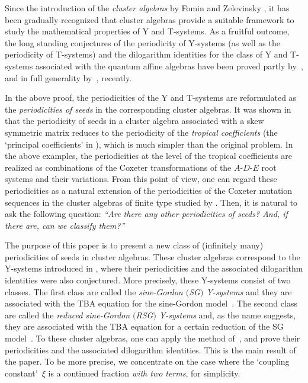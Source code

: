 \documentclass[pdftex]{sigma}
\numberwithin{equation}{section}
\theoremstyle{definition}
\begin{document}
Since the introduction of
the {\em cluster algebras}
by Fomin and Zelevinsky \cite{Fomin02, Fomin03a},
it has been gradually recognized that
cluster algebras provide a suitable
framework to study the mathema\-ti\-cal properties
of Y and T-systems.
As a fruitful outcome, the long standing conjectures
of the periodicity of Y-systems \cite{Zamolodchikov91,
Ravanini93,Kuniba94a}
 (as well as
the periodicity of  T-systems)
and the dilogarithm identities \cite{Kirillov90,Bazhanov90,
Kuniba93a,Gliozzi95}
 for the class of Y and T-systems
associated with the quantum af\/f\/ine algebras
have been
proved
partly
by~\cite{Fomin03b, Chapoton05},
and in full generality
by~\cite{Keller08,Inoue10c,
Nakanishi09,Keller10,Inoue10a,Inoue10b},
recently.


In the above proof, the periodicities of the
Y and T-systems  are reformulated as
the {\em periodici\-ties of seeds\/} in the corresponding cluster algebras.
It was shown in  \cite{Inoue10a} that
 the periodicity of seeds in
a cluster algebra associated with a skew symmetric matrix
reduces
to the periodicity of the
 {\em tropical coefficients} (the `principal coef\/f\/icients'
in \cite{Fomin07}),
which is much simpler than the original problem.
In the above examples,
the periodicities at the level of the tropical coef\/f\/icients
are realized
as combinations of the Coxeter transformations
of the $A$-$D$-$E$ root systems and their variations.
{}From this point of view,
one can regard  these periodicities as a natural extension
of the  periodicities of
the Coxeter mutation sequences
in the cluster algebras of f\/inite type
studied by \cite{Fomin03a,Fomin03b,Fomin07}.
Then, it is natural to ask the following question:
{\em ``Are there any other periodicities of seeds?
And, if there are, can we classify them?''}

The purpose of this paper is to present
 a new class of
(inf\/initely many)  periodicities of seeds in cluster algebras.
These cluster algebras correspond to the
Y-systems introduced
in \cite{Tateo95},
where their periodicities
and the associated dilogarithm identities
were also conjectured.
More precisely, these Y-systems consist of two classes.
The f\/irst class are called the {\em sine-Gordon $($SG$)$ Y-systems\/}
and they are
associated with the TBA equation for the sine-Gordon model~\cite{Zamolodchikov79}.
The second class are called the {\em reduced sine-Gordon $($RSG$)$
Y-systems\/}
and, as the name suggests,
they are  associated with the TBA equation
for a certain reduction of the SG model~\cite{Smirnov90,
Bernard90}.
To these cluster algebras, one can apply the method of~\cite{Inoue10a}, and prove their periodicities
and the associated dilogarithm identities.
This is the main result of the paper.
To be more precise, we concentrate on the case
where the `coupling constant'~$\xi$ is a
continued fraction {\em with two terms}, for simplicity.
\end{document}
